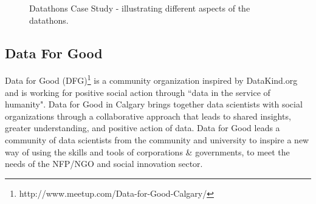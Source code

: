 \begin{figure}[!htb] %
\begin{center}
\caption{Datathons Case Study - illustrating different aspects of the datathons.}
\label{fig:datathons}
\end{center}
\end{figure}

\subsection{Data For Good}

Data for Good (DFG)\footnote{http://www.meetup.com/Data-for-Good-Calgary/} is a community organization inspired by DataKind.org and is working for positive social action through ``data in the service of humanity". Data for Good in Calgary brings together data scientists with social organizations through a  collaborative approach that leads to shared insights, greater understanding, and positive action of data. Data for Good leads a community of data scientists from the community and university to inspire a new way of using the skills and tools of corporations \& governments, to meet the needs of the NFP/NGO and social innovation sector.

